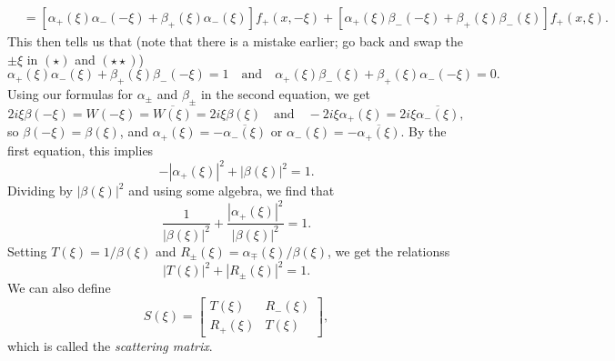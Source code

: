 \begin{remark}
\begin{align*}
    &= [\alpha_+(\xi) \alpha_-(-\xi) + \beta_+(\xi) \alpha_-(\xi)] f_+(x, -\xi)
    + [\alpha_+(\xi) \beta_-(-\xi) + \beta_+(\xi) \beta_-(\xi)] f_+(x, \xi).
  \end{align*}
  This then tells us that (note that there is a mistake
  earlier;
  go back and swap the
  $\pm \xi$ in $(\star)$ and $(\star\star)$)
  \[
    \alpha_+(\xi) \alpha_-(\xi) + \beta_+(\xi) \beta_-(-\xi) = 1
    \quad \text{and} \quad
    \alpha_+(\xi) \beta_-(\xi) + \beta_+(\xi) \alpha_-(-\xi) = 0.
  \]
  Using our formulas for $\alpha_{\pm}$ and $\beta_{\pm}$ in the second equation,
  we get
  \[
    2i \xi \beta(-\xi) = W(-\xi) = \overline{W(\xi)}
    = 2 i\xi \beta(\xi) \quad \text{and} \quad
    -2i \xi \alpha_+(\xi) = 2i\xi \overline{\alpha_-(\xi)},
  \]
  so $\beta(-\xi) = \beta(\xi)$, and
  $\alpha_+(\xi) = -\overline{\alpha_-(\xi)}$
  or $\alpha_-(\xi) = -\overline{\alpha_+(\xi)}$.
  By the first equation, this implies
  \[
    -|\alpha_+(\xi)|^2 + |\beta(\xi)|^2 = 1.
  \]
  Dividing by $|\beta(\xi)|^2$ and using some algebra,
  we find that
  \[
    \frac{1}{|\beta(\xi)|^2}
    + \frac{|\alpha_+(\xi)|^2}{|\beta(\xi)|^2} = 1.
  \]
  Setting $T(\xi) = 1 / \beta(\xi)$ and
  $R_{\pm}(\xi) = \alpha_{\mp}(\xi) / \beta(\xi)$,
  we get the relationss
  \[
    |T(\xi)|^2 + |R_{\pm}(\xi)|^2 = 1.
  \]
  We can also define
  \[
    S(\xi) =
    \begin{bmatrix}
      T(\xi) & R_-(\xi) \\
      R_+(\xi) & T(\xi)
    \end{bmatrix},
  \]
  which is called the \emph{scattering matrix}.
\end{remark}
